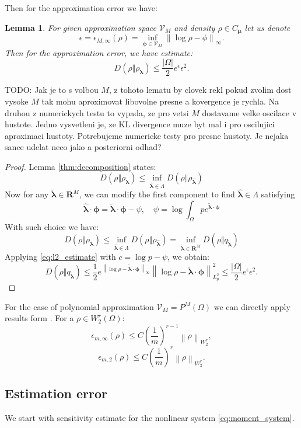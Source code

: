 \documentclass{article}
\newtheorem{lemma}[theorem]{Lemma}
\def\vc#1{\mathbf{\boldsymbol{#1}}}     %
\newcommand{\norm}[1]{\left\lVert#1\right\rVert}
\def\todo#1{{\color{red}TODO: #1}}
\def\R{\mathbf{R}}
\def\abs#1{|#1|}
\def\vl{{\vc\lambda}}
\def\estvl{{\vc{\hat\lambda}}}
\def\vmu{\vc\mu}
\def\vphi{\vc\phi}
\begin{document}
Then for the approximation error we have:
\begin{lemma}
\label{thm:approx_error}
For given approximation space $\mathcal V_M$ and density $\rho\in C_{\vmu}$ let us denote
\[
  \epsilon = \epsilon_{M,\infty}(\rho) = \inf_{\vphi \in \mathcal V_M} \norm{\log \rho - \phi}_\infty.
\]
Then for the approximation error, we have estimate:
\[
D(\rho\Vert\rho_{\vl})  \le \frac{\abs{\Omega}}{2} e^{\epsilon} \epsilon^2.
\]
\end{lemma}
\todo{Jak je to s volbou $M$, z tohoto lematu by clovek rekl pokud zvolim dost vysoke $M$ tak mohu aproximovat libovolne presne a kovergence je rychla.
Na druhou z numerickych testu to vypada, ze pro vetsi $M$ dostavame velke oscilace v hustote. 
Jedno vysvetleni je, ze KL divergence muze byt mal i pro oscilujici aproximaci hustoty. Potrebujeme numericke testy pro presne hustoty.
Je nejaka sance udelat neco jako a posteriorni odhad?} 

\begin{proof}
Lemma \ref{thm:decomposition} states:
\[
D(\rho\Vert\rho_{\vl}) \le \inf_{\estvl \in \Lambda} D(\rho\Vert\rho_{\estvl})
\]
Now for any $\vc{\tilde\lambda} \in \R^M$, we can modify the first component to find $\estvl \in \Lambda$ satisfying
\[
  \estvl \cdot \vphi = \vc{\tilde\lambda} \cdot \vphi - \psi, \quad \psi 
                             = \log \int_\Omega p e^{\widetilde{\vc\lambda}\cdot \vc \phi}
\]
With such choice we have:
\[
D(\rho\Vert\rho_{\vl}) \le \inf_{\estvl \in \Lambda} D(\rho\Vert\rho_{\estvl})
=\inf_{\vc{\tilde\lambda} \in \R^M} D(\rho\Vert q_{\vc{\tilde\lambda}})
\]
Applying \eqref{eq:l2_estimate} with $c = \log p - \psi$, we obtain:
\[
  D(\rho\Vert q_{\vc{\tilde\lambda}}) \le 
  \frac{1}{2}
  e^{\norm{\log \rho - \vc{\tilde\lambda}\cdot \vc \phi}_\infty} 
    \norm{\log \rho - \vc{\tilde\lambda}\cdot \vc \phi}_{L^2_p}^2
  \le \frac{\abs{\Omega}}{2} e^{\epsilon} \epsilon^2.
\]
\end{proof}
For the case of polynomial approximation $\mathcal V_M = P^M(\Omega)$ we can directly apply results form \cite[Section 7]{Barron1991}. For a $\rho \in W^r_2(\Omega)$:
\[
    \epsilon_{m,\infty}(\rho) \le C \left(\frac{1}{m}\right)^{r-1} \norm{\rho}_{W^r_2},
\]
\[
    \epsilon_{m,2}(\rho) \le C \left(\frac{1}{m}\right)^{r}\norm{\rho}_{W^r_2}.
\]
\subsection{Estimation error}
We start with sensitivity estimate for the nonlinear system \eqref{eq:moment_system}.
\end{document}
